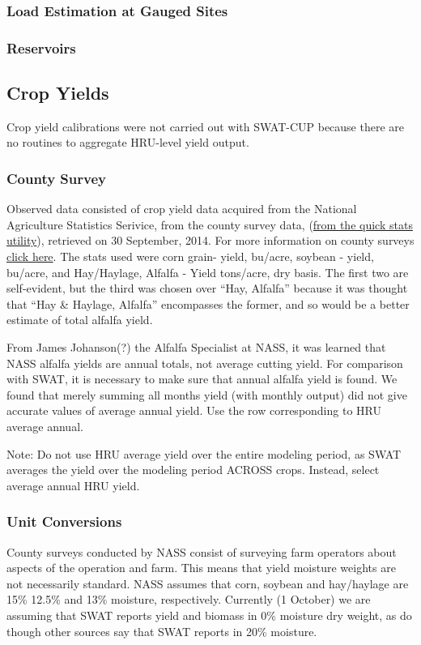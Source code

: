 \documentclass[10pt,letterpaper]{article}%
\begin{document}
		\subsubsection{Load Estimation at Gauged Sites}
		\subsubsection{Reservoirs}
	\pagebreak
	\subsection{Crop Yields}
	Crop yield calibrations were not carried out with SWAT-CUP because there are no routines to aggregate HRU-level yield output. 
		\subsubsection{County Survey}
		Observed data consisted of crop yield data acquired from the National Agriculture Statistics Serivice, from the county survey data, (\href{http://quickstats.nass.usda.gov/results/CD8890FD-566F-3F66-8C8A-CB932E358991}{from the quick stats utility}), retrieved on 30 September, 2014. For more information on county surveys \href{http://www.nass.usda.gov/Surveys/Guide_to_NASS_Surveys/County_Agricultural_Production/index.asp}{click here}. The stats used were corn grain- yield, bu/acre, soybean - yield, bu/acre, and Hay/Haylage, Alfalfa - Yield tons/acre, dry basis. The first two are self-evident, but the third was chosen over ``Hay, Alfalfa'' because it was thought that ``Hay \& Haylage, Alfalfa'' encompasses the former, and so would be a better estimate of total alfalfa yield.
		
		From James Johanson(?) the Alfalfa Specialist at NASS, it was learned that NASS alfalfa yields  are annual totals, not average cutting yield. For comparison with SWAT, it is necessary to make sure that annual alfalfa yield is found. We found that merely summing all months yield (with monthly output) did not give accurate values of average annual yield. Use the row corresponding to HRU average annual. 
		
		Note: Do not use HRU average yield over the entire modeling period, as SWAT averages the yield over the modeling period ACROSS crops. Instead, select average annual HRU yield. 

		\subsubsection{Unit Conversions}
		County surveys conducted by NASS consist of surveying farm operators about aspects of the operation and farm. This means that yield moisture weights are not necessarily standard. NASS assumes that corn, soybean and hay/haylage are 15\% 12.5\% and 13\% moisture, respectively. 
		Currently (1 October) we are assuming that SWAT reports yield and biomass in 0\% moisture dry weight, as do \citet{almendinger_contructingsunrise_2010} though other sources \citep{srinivasan_swatungauged_2010} say that SWAT reports in 20\% moisture. 
	
\end{document}
